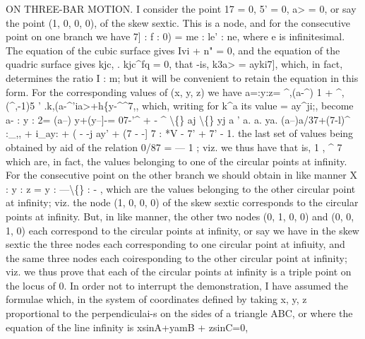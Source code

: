 \documentclass[12pt,a4paper]{article}
\begin{document}
ON THREE-BAR MOTION.
I
consider
the
point
17 = 0,
5' = 0,
a> = 0,
or
say
the
point
(1,
0,
0,
0),
of
the
skew
sextic.
This
is
a
node,
and
for
the
consecutive
point
on
one
branch
we
have
7]
:
f
:
0) = me
:
le'
:
ne,
where
e
is
infinitesimal.
The
equation
of
the
cubic
surface
gives
Ivi + n" = 0, and
the
equation
of
the
quadric
surface
gives
kjc,
.
kjc\textasciicircum{}fq = 0,
that
-is,
k3a> = ayki7],
which,
in
fact,
determines
the
ratio
I
: m;
but
it
will
be
convenient
to
retain
the
equation
in
this
form.
For
the
corresponding
values
of
(x,
y, z) we have
a=:y:z=
\textasciicircum{}\textbullet{},(a-\textasciicircum{}) 1 + \textasciicircum{},(\textasciicircum{},-1)5
'
.k,(a-\textasciicircum{}'ia>+h\{y-\textasciicircum{}\textasciicircum{}7,,
which, writing
for k\textasciicircum{}a
its value = ay\textasciicircum{}ji;, become
a-
: y
: 2=
(a--)
y+(y--]-=
07-'\textasciicircum{} + -
\textasciicircum{}
\textbackslash\{\}
aj
\textbackslash\{\}
yj a
'
a.
a.
ya.
(a--)a/37+(7-l)\textasciicircum{}
:\_,, + i\_ay: + \guillemotleft{}
(
\guillemotleft{} - -j
ay' + (7 - -] 7
: *V - 7' + 7' - 1.
the
last
set
of
values
being
obtained
by
aid
of
the
relation
0/87 = --- 1
;
viz.
we
thus have
that
is,
1
,
\textasciicircum{}
7
which
are,
in
fact,
the
values
belonging
to
one
of
the
circular
points
at
infinity.
For
the
consecutive
point
on
the
other
branch
we
should
obtain
in
like
manner
X
: y
: z = y
: ---\textbackslash\{\}
: -
,
which
are
the
values
belonging
to
the
other
circular
point
at
infinity;
viz.
the
node
(1,
0,
0,
0)
of
the
skew
sextic
corresponds
to
the
circular
points at
infinity.
But,
in
like manner, the
other two nodes
(0,
1,
0, 0) and
(0,
0,
1, 0)
each
correspond
to
the
circular
points
at
infinity,
or
say we
have
in
the skew
sextic
the
three
nodes
each
corresponding
to
one
circular
point
at
infiuity,
and
the
same
three
nodes
each
coiresponding
to
the
other
circular
point
at
infinity;
viz.
we
thus
prove that each
of the circular points at
infinity
is a
triple point on
the
locus of 0.
In
order
not
to
interrupt
the
demonstration,
I
have assumed
the
formulae
which,
in
the system
of
coordinates defined by taking
x, y, z proportional
to
the
perpendiculai-s
on
the
sides
of a
triangle ABC,
or
where
the
equation
of
the
line
infinity
is
xsinA+yamB + zsinC=0,
\end{document}
